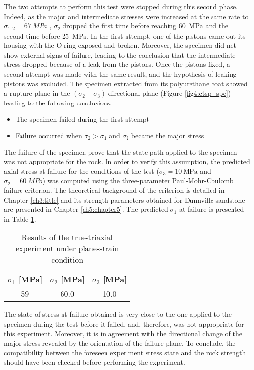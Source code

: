 The two attempts to perform this test were stopped during this second phase. Indeed, as the major and intermediate stresses were increased at the same rate to $\sigma_{1,2} = \SI{67}{MPa}$ , $\sigma_2$ dropped the first time before reaching \SI{60}{MPa} and the second time before \SI{25}{MPa}. In the first attempt, one of the pistons came out its housing with the O-ring exposed and broken. Moreover, the specimen did not show external signs of failure, leading to the conclusion that the intermediate stress dropped because of a leak from the pistons. Once the pistons fixed, a second attempt was made with the same result, and the hypothesis of leaking pistons was excluded. The specimen extracted from its polyurethane coat showed a rupture plane in the $(\sigma_{2}-\sigma_{3})$ directional plane (Figure \ref{fig4:ctsp_spe}) leading to the following conclusions:
\begin{itemize}
    \item The specimen failed during the first attempt
    \item Failure occurred when $\sigma_2>\sigma_1$ and $\sigma_{2}$ became the major stress
\end{itemize}
The failure of the specimen prove that the state path applied to the specimen was not appropriate for the rock. In order to verify this assumption, the predicted axial stress at failure for the conditions of the test ($\sigma_3=\SI{10}{\mega\pascal}$ and $\sigma_2=\SI{60}{MPa}$) was computed using the three-parameter Paul-Mohr-Coulomb failure criterion. The theoretical background of the criterion is detailed in Chapter \ref{ch3:title} and its strength parameters obtained for Dunnville sandstone are presented in Chapter \ref{ch5:chapter5}. The predicted $\sigma_1$ at failure is presented in Table \ref{tb4:TT3_sol}.
\begin{table}
    \centering
    \caption{Results of the true-triaxial experiment under plane-strain condition}
    \begin{tabular}{ccc}
        \hline
        $\sigma_1$ [\si{MPa}] & $\sigma_2$ [\si{MPa}] & $\sigma_3$ [\si{MPa}] \\
        \hline
        \hline
        59 & 60.0 & 10.0 \\
        \hline
    \end{tabular}
    \label{tb4:TT3_sol}
\end{table}
The state of stress at failure obtained is very close to the one applied to the specimen during the test before it failed, and, therefore, was not appropriate for this experiment. Moreover, it is in agreement with the directional change of the major stress revealed by the orientation of the failure plane. To conclude, the compatibility between the foreseen experiment stress state and the rock strength should have been checked before performing the experiment. 

